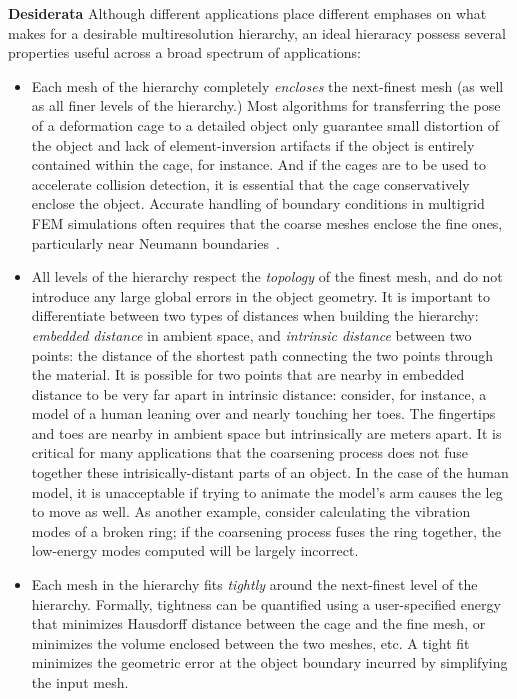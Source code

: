 \noindent \textbf{Desiderata} Although different applications place different
emphases on what makes for a desirable multiresolution hierarchy, an ideal hieraracy possess several properties useful across a broad spectrum of applications:
\begin{itemize}
\item Each mesh of the hierarchy completely \emph{encloses} the next-finest mesh (as well as all finer
levels of the hierarchy.) Most algorithms for transferring the
pose of a deformation cage to a detailed object only guarantee small distortion of the
object and lack of element-inversion artifacts if the object is entirely
contained within the cage, for instance. And if the cages are to be used to
accelerate collision detection, it is essential that the cage conservatively
enclose the object. Accurate handling of boundary conditions in multigrid FEM simulations often requires that the coarse meshes enclose the fine ones, particularly near Neumann boundaries~\cite{Chan96}.
\item All levels of the hierarchy respect the \emph{topology} of the finest mesh, and do not introduce
any large global errors in the object geometry. It is important to
differentiate between two types of distances when building the hierarchy:
\emph{embedded distance} in ambient space, and \emph{intrinsic distance}
between two points: the distance of the shortest path connecting the two points through the material. It is possible for two points that are nearby in
embedded distance to be very far apart in intrinsic distance: consider, for
instance, a model of a human leaning over and nearly touching her toes. The
fingertips and toes are nearby in ambient space but intrinsically are meters
apart. It is critical for many applications that the coarsening process does
not fuse together these intrisically-distant parts of an object. In the case of the human model, it
is unacceptable if trying to animate the model's arm causes the leg to move as
well. As another example, consider calculating the vibration modes of a broken
ring; if the coarsening process fuses the ring together, the low-energy modes computed
will be largely incorrect.
\item Each mesh in the hierarchy fits \emph{tightly} around the next-finest level of the hierarchy.
Formally, tightness can be quantified using a user-specified energy that
minimizes Hausdorff distance between the cage and the fine mesh, or minimizes
the volume enclosed between the two meshes, etc. A tight fit minimizes the geometric error at the object boundary incurred by simplifying the input mesh.
\end{itemize}
